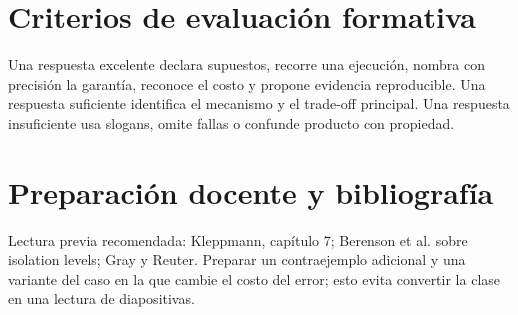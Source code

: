 \documentclass[variant=docente,cover=institutional,mode=screen]{ua-engineering-v6-article}
\begin{document}
\section{Criterios de evaluación formativa}
Una respuesta excelente declara supuestos, recorre una ejecución, nombra con precisión la garantía, reconoce el costo y propone evidencia reproducible. Una respuesta suficiente identifica el mecanismo y el trade-off principal. Una respuesta insuficiente usa slogans, omite fallas o confunde producto con propiedad.

\section{Preparación docente y bibliografía}
Lectura previa recomendada: Kleppmann, capítulo 7; Berenson et al. sobre isolation levels; Gray y Reuter. Preparar un contraejemplo adicional y una variante del caso en la que cambie el costo del error; esto evita convertir la clase en una lectura de diapositivas.
\end{document}

